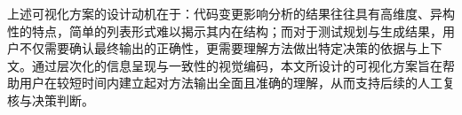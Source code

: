 上述可视化方案的设计动机在于：代码变更影响分析的结果往往具有高维度、异构性的特点，简单的列表形式难以揭示其内在结构；而对于测试规划与生成结果，用户不仅需要确认最终输出的正确性，更需要理解方法做出特定决策的依据与上下文。通过层次化的信息呈现与一致性的视觉编码，本文所设计的可视化方案旨在帮助用户在较短时间内建立起对方法输出全面且准确的理解，从而支持后续的人工复核与决策判断。




